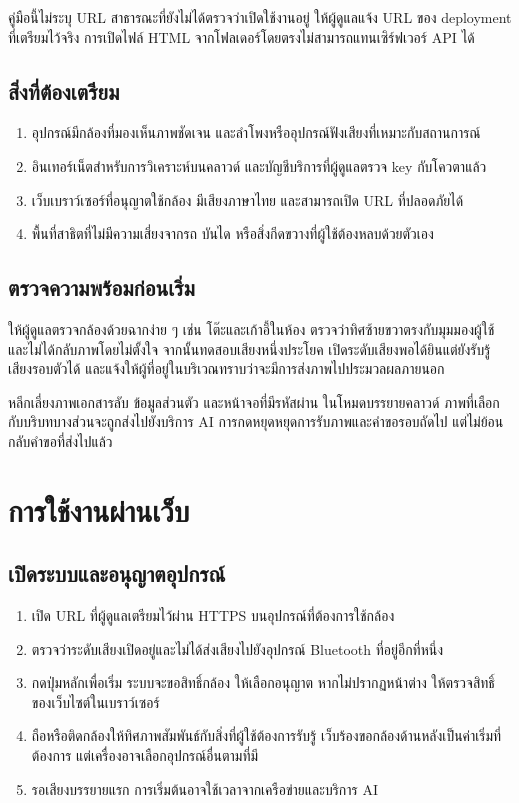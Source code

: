 คู่มือนี้ไม่ระบุ URL สาธารณะที่ยังไม่ได้ตรวจว่าเปิดใช้งานอยู่ ให้ผู้ดูแลแจ้ง URL ของ deployment ที่เตรียมไว้จริง การเปิดไฟล์ HTML จากโฟลเดอร์โดยตรงไม่สามารถแทนเซิร์ฟเวอร์ API ได้

\section{สิ่งที่ต้องเตรียม}
\begin{enumerate}
\item อุปกรณ์มีกล้องที่มองเห็นภาพชัดเจน และลำโพงหรืออุปกรณ์ฟังเสียงที่เหมาะกับสถานการณ์
\item อินเทอร์เน็ตสำหรับการวิเคราะห์บนคลาวด์ และบัญชีบริการที่ผู้ดูแลตรวจ key กับโควตาแล้ว
\item เว็บเบราว์เซอร์ที่อนุญาตใช้กล้อง มีเสียงภาษาไทย และสามารถเปิด URL ที่ปลอดภัยได้
\item พื้นที่สาธิตที่ไม่มีความเสี่ยงจากรถ บันได หรือสิ่งกีดขวางที่ผู้ใช้ต้องหลบด้วยตัวเอง
\end{enumerate}

\section{ตรวจความพร้อมก่อนเริ่ม}
ให้ผู้ดูแลตรวจกล้องด้วยฉากง่าย ๆ เช่น โต๊ะและเก้าอี้ในห้อง ตรวจว่าทิศซ้ายขวาตรงกับมุมมองผู้ใช้และไม่ได้กลับภาพโดยไม่ตั้งใจ จากนั้นทดสอบเสียงหนึ่งประโยค เปิดระดับเสียงพอได้ยินแต่ยังรับรู้เสียงรอบตัวได้ และแจ้งให้ผู้ที่อยู่ในบริเวณทราบว่าจะมีการส่งภาพไปประมวลผลภายนอก

หลีกเลี่ยงภาพเอกสารลับ ข้อมูลส่วนตัว และหน้าจอที่มีรหัสผ่าน ในโหมดบรรยายคลาวด์ ภาพที่เลือกกับบริบทบางส่วนจะถูกส่งไปยังบริการ AI การกดหยุดหยุดการรับภาพและคำขอรอบถัดไป แต่ไม่ย้อนกลับคำขอที่ส่งไปแล้ว

\chapter{การใช้งานผ่านเว็บ}
\section{เปิดระบบและอนุญาตอุปกรณ์}
\begin{enumerate}
\item เปิด URL ที่ผู้ดูแลเตรียมไว้ผ่าน HTTPS บนอุปกรณ์ที่ต้องการใช้กล้อง
\item ตรวจว่าระดับเสียงเปิดอยู่และไม่ได้ส่งเสียงไปยังอุปกรณ์ Bluetooth ที่อยู่อีกที่หนึ่ง
\item กดปุ่มหลักเพื่อเริ่ม ระบบจะขอสิทธิ์กล้อง ให้เลือกอนุญาต หากไม่ปรากฏหน้าต่าง ให้ตรวจสิทธิ์ของเว็บไซต์ในเบราว์เซอร์
\item ถือหรือติดกล้องให้ทิศภาพสัมพันธ์กับสิ่งที่ผู้ใช้ต้องการรับรู้ เว็บร้องขอกล้องด้านหลังเป็นค่าเริ่มที่ต้องการ แต่เครื่องอาจเลือกอุปกรณ์อื่นตามที่มี
\item รอเสียงบรรยายแรก การเริ่มต้นอาจใช้เวลาจากเครือข่ายและบริการ AI
\end{enumerate}


